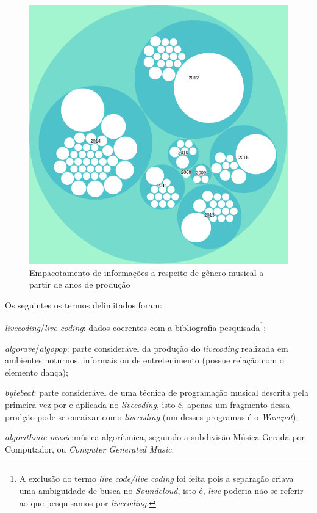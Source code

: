 \begin{figure}[h]
\begin{center}
\includegraphics[scale=0.6]{./imagens/zoomable_circle_packing_genre_year_livecoding.png}
\caption{Empacotamento de informações a respeito de gênero musical a partir de anos de produção}
\label{fig:pacotao}
\end{center}
\end{figure}

Os seguintes os termos delimitados foram: \begin{inparaenum}
\item \emph{livecoding}/\emph{live-coding}: dados coerentes com a bibliografia pesquisada\footnote{A exclusão do termo \emph{live code/live coding} foi feita pois a separação criava uma ambiguidade de busca no \emph{Soundcloud}, isto é, \emph{live} poderia não se referir ao que pesquisamos por \emph{livecoding}.};
\item \emph{algorave}/\emph{algopop}: parte considerável da produção do \emph{livecoding} realizada em ambientes noturnos, informais ou de entretenimento (possue relação com o elemento dança);
\item \emph{bytebeat}: parte considerável de uma técnica de programação musical descrita pela primeira vez por  e aplicada no \emph{livecoding}, isto é, apenas um fragmento dessa prodção pode se encaixar como \emph{livecoding} (um desses programas é o \emph{Wavepot});
\item \emph{algorithmic music}:música algorítmica, seguindo a subdivisão Música Gerada por Computador, ou \emph{Computer Generated Music}\cite{cope_prefacio_2008}.
\end{inparaenum}

